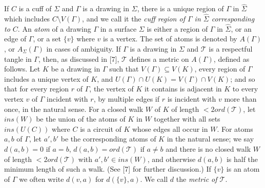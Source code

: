 If $C$ is a cuff of $\Sigma$ and $\Gamma$ is a drawing in $\Sigma$, there is a unique region of $\Gamma$ in $\hat{\Sigma}$ which includes $C \setminus V(\Gamma)$, and we call it the \textit{cuff region of $\Gamma$ in $\hat{\Sigma}$ corresponding to $C$}. An \textit{atom} of a drawing $\Gamma$ in a surface $\Sigma$ is either a region of $\Gamma$ in $\hat{\Sigma}$, or an edge of $\Gamma$, or a set $\{v\}$ where $v$ is a vertex. The set of atoms is denoted by $A(\Gamma)$, or $A_\Sigma(\Gamma)$ in cases of ambiguity. If $\Gamma$ is a drawing in $\Sigma$ and $\mathcal{T}$ is a respectful tangle in $\Gamma$, then, as discussed in [7], $\mathcal{T}$ defines a metric on $A(\Gamma)$, defined as follows. Let $K$ be a drawing in $\Gamma$ such that $V(\Gamma) \subseteq V(K)$, every region of $\Gamma$ includes a unique vertex of $K$, and $U(\Gamma) \cap U(K) = V(\Gamma) \cap V(K)$; and so that for every region $r$ of $\Gamma$, the vertex of $K$ it contains is adjacent in $K$ to every vertex $v$ of $\Gamma$ incident with $r$, by multiple edges if $r$ is incident with $v$ more than once, in the natural sense. For a closed walk $W$ of $K$ of length $< 2 ord(\mathcal{T})$, let $ins(W)$ be the union of the atoms of $K$ in $W$ together with all sets $ins(U(C))$ where $C$ is a circuit of $K$ whose edges all occur in $W$. For atoms $a, b$ of $\Gamma$, let $a', b'$ be the corresponding atoms of $K$ in the natural sense; we say $d(a, b) = 0$ if $a = b$, $d(a, b) = ord(\mathcal{T})$ if $a \ne b$ and there is no closed walk $W$ of length $< 2 ord(\mathcal{T})$ with $a', b' \in ins(W)$, and otherwise $d(a, b)$ is half the minimum length of such a walk. (See [7] for further discussion.) If $\{v\}$ is an atom of $\Gamma$ we often write $d(v, a)$ for $d(\{v\}, a)$. We call $d$ the \textit{metric of $\mathcal{T}$}.
